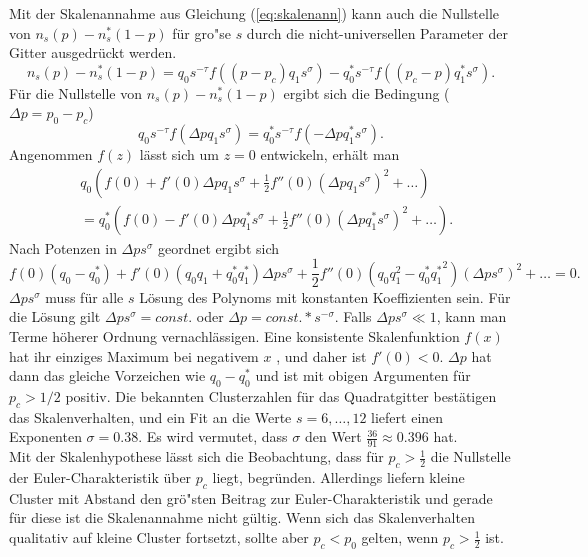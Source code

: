 Mit der Skalenannahme aus Gleichung (\ref{eq:skalenann}) kann auch die Nullstelle von $n_s(p)-n_s^*(1-p)$ f\"ur gro"se $s$ durch die nicht-universellen Parameter der Gitter ausgedr\"uckt werden. 
\begin{equation}
      n_s(p)-n_s^*(1-p)=q_0 s^{-\tau}f((p-p_c)q_1s^{\sigma})-q_0^* s^{-\tau}f((p_c-p)q_1^*s^{\sigma}).
\end{equation}
F\"ur die Nullstelle von $n_s(p)-n_s^*(1-p)$ ergibt sich die Bedingung ($\Delta p=p_0-p_c$)
\begin{equation}
      q_0 s^{-\tau}f(\Delta p q_1s^{\sigma})=q_0^* s^{-\tau}f(-\Delta p q_1^*s^{\sigma}).
\end{equation}
Angenommen $f(z)$ l\"asst sich um $z=0$ entwickeln, erh\"alt man
\begin{equation}
\begin{split}
 & q_0(f(0)+f'(0)\Delta p q_1s^{\sigma}+\frac{1}{2}f''(0)(\Delta p q_1s^{\sigma})^2+\ldots) \\ & =  q_0^* (f(0)-f'(0)\Delta p q_1^*s^{\sigma}+\frac{1}{2}f''(0)(\Delta p q_1^*s^{\sigma})^2+\ldots).
\end{split}
\end{equation}
Nach Potenzen in $\Delta p s^\sigma$ geordnet ergibt sich
\begin{equation}
  f(0)(q_0-q_0^*)+f'(0)(q_0q_1+q_0^*q_1^*)\Delta p s^\sigma+\frac{1}{2}f''(0)(q_0q_1^2-q_0^*{q_1^{*}}^2)(\Delta ps^{\sigma})^2+\ldots=0.
\end{equation}
$\Delta p s^\sigma$ muss f\"ur alle $s$ L\"osung des Polynoms mit konstanten Koeffizienten sein. F\"ur die L\"osung gilt $\Delta p s^\sigma=const.$ oder $\Delta p=const.* s^{-\sigma}$. Falls $\Delta ps^\sigma \ll 1$, kann man Terme h\"oherer Ordnung vernachl\"assigen. Eine konsistente Skalenfunktion $f(x)$ hat ihr einziges Maximum bei negativem $x$ \cite{Stauffer:95}, und daher ist $f'(0)<0$. $\Delta p$ hat dann das gleiche Vorzeichen wie $q_0-q_0^*$ und ist mit obigen Argumenten f\"ur $p_c>1/2$ positiv. Die bekannten Clusterzahlen f\"ur das Quadratgitter best\"atigen das Skalenverhalten, und ein Fit an die Werte $s=6,\ldots,12$ liefert einen Exponenten $\sigma=0.38$. Es wird vermutet, dass $\sigma$ den Wert $\frac{36}{91}\approx 0.396$ hat. \\ 

Mit der Skalenhypothese l\"asst sich die Beobachtung, dass f\"ur $p_c>\frac{1}{2}$ die Nullstelle der Euler-Charakteristik \"uber $p_c$ liegt, begr\"unden. Allerdings liefern kleine Cluster mit Abstand den gr\"o"sten Beitrag zur Euler-Charakteristik und gerade f\"ur diese ist die Skalenannahme nicht g\"ultig. Wenn sich das Skalenverhalten qualitativ auf kleine Cluster fortsetzt, sollte aber $p_c<p_0$ gelten, wenn $p_c>\frac{1}{2}$ ist.  

